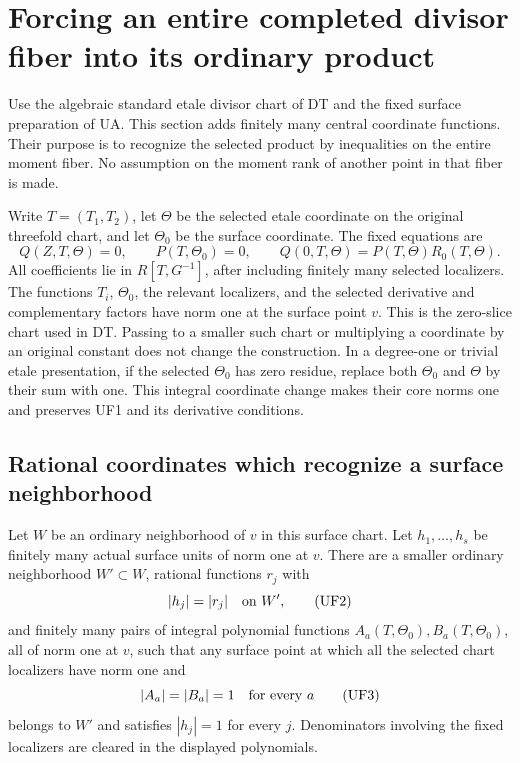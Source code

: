 \section{Forcing an entire completed divisor fiber into its ordinary product}
\label{sec:r13-divisor-fiber-product-localization}

Use the algebraic standard etale divisor chart of DT and the
fixed surface preparation of UA.  This section adds finitely
many central coordinate functions.  Their purpose is to
recognize the selected product by inequalities on the entire
moment fiber.  No assumption on the moment rank of another
point in that fiber is made.

Write \(T=(T_1,T_2)\), let \(\Theta\) be the selected etale
coordinate on the original threefold chart, and let
\(\Theta_0\) be the surface coordinate.  The fixed equations
are
\[
 Q(Z,T,\Theta)=0,\qquad P(T,\Theta_0)=0,
 \qquad Q(0,T,\Theta)=P(T,\Theta)R_0(T,\Theta).
\tag{UF1}
\]
All coefficients lie in \(R[T,G^{-1}]\), after including
finitely many selected localizers.  The functions \(T_i\),
\(\Theta_0\), the relevant localizers, and the selected
derivative and complementary factors have norm one at the
surface point \(v\).  This is the zero-slice chart used in
DT.  Passing to a smaller such chart or multiplying a
coordinate by an original constant does not change the
construction.  In a degree-one or trivial etale presentation,
if the selected \(\Theta_0\) has zero residue, replace both
\(\Theta_0\) and \(\Theta\) by their sum with one.  This
integral coordinate change makes their core norms one and
preserves UF1 and its derivative conditions.

\subsection{Rational coordinates which recognize a surface neighborhood}

\begin{lemma}
\label{lem:r13-rational-neighborhood-packet}
Let \(W\) be an ordinary neighborhood of \(v\) in this
surface chart.  Let \(h_1,\ldots,h_s\) be finitely many
actual surface units of norm one at \(v\).  There are a
smaller ordinary neighborhood \(W'\subset W\), rational
functions \(r_j\) with
\[
                         |h_j|=|r_j|\quad\hbox{on }W',
\tag{UF2}
\]
and finitely many pairs of integral polynomial functions
\(A_a(T,\Theta_0),B_a(T,\Theta_0)\), all of norm one
at \(v\), such that any surface point at which all the
selected chart localizers have norm one and
\[
                       |A_a|=|B_a|=1\quad\hbox{for every }a
\tag{UF3}
\]
belongs to \(W'\) and satisfies \(|h_j|=1\) for every
\(j\).  Denominators involving the fixed localizers are
cleared in the displayed polynomials.
\end{lemma}

